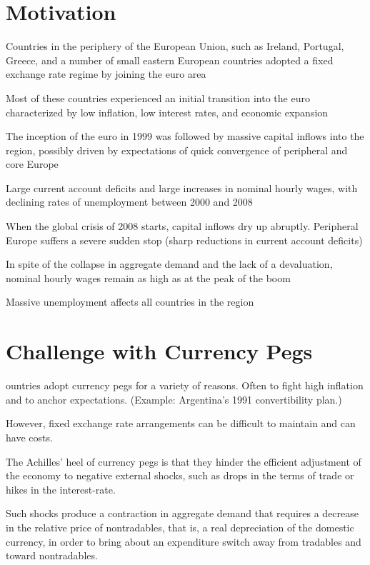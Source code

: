 \section{Motivation}

Countries in the periphery of the European Union, such as Ireland, Portugal,
Greece, and a number of small eastern European countries adopted a fixed
exchange rate regime by joining the euro area

Most of these countries experienced an initial transition into the euro characterized
by low inflation, low interest rates, and economic expansion

The inception of the euro in 1999 was followed by massive capital inflows into the
region, possibly driven by expectations of quick convergence of peripheral and core
Europe

Large current account deficits and large increases in nominal hourly wages, with
declining rates of unemployment between 2000 and 2008

When the global crisis of 2008 starts, capital inflows dry up abruptly. Peripheral
Europe suffers a severe sudden stop (sharp reductions in current account deficits)

In spite of the collapse in aggregate demand and the lack of a devaluation,
nominal hourly wages remain as high as at the peak of the boom

Massive unemployment affects all countries in the region

\section{Challenge with Currency Pegs}

ountries adopt currency pegs for a variety of reasons. Often to fight high
inflation and to anchor expectations. (Example: Argentina's 1991
convertibility plan.)

However, fixed exchange rate arrangements can be difficult to maintain and
can have costs.

The Achilles' heel of currency pegs is that they hinder the efficient
adjustment of the economy to negative external shocks, such as drops in the
terms of trade or hikes in the interest-rate.

Such shocks produce a contraction in aggregate demand that requires a
decrease in the relative price of nontradables, that is, a real depreciation of
the domestic currency, in order to bring about an expenditure switch away
from tradables and toward nontradables.

